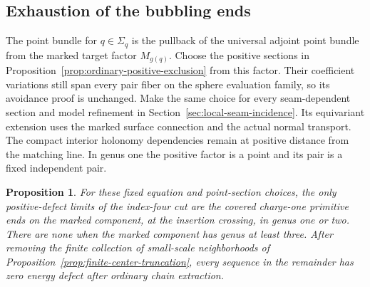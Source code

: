 \documentclass[11pt]{amsart}
\newtheorem{proposition}[theorem]{Proposition}
\theoremstyle{definition}
\theoremstyle{remark}
\theoremstyle{plain}
\begin{document}
\subsection{Exhaustion of the bubbling ends}
\label{sec:all-bubbling-cut-ends}

The point bundle for $q\in\Sigma_q$ is the pullback of
the universal adjoint point bundle from the marked
target factor $M_{g(q)}$. Choose the positive sections
in Proposition~\ref{prop:ordinary-positive-exclusion}
from this factor. Their coefficient variations still
span every pair fiber on the sphere evaluation family,
so its avoidance proof is unchanged.
Make the same choice for every seam-dependent section
and model refinement in
Section~\ref{sec:local-seam-incidence}.
Its equivariant extension uses the marked surface
connection and the actual normal transport.
The compact interior holonomy dependencies remain
at positive distance from the matching line.
In genus one the positive factor is a point and its
pair is a fixed independent pair.

\begin{proposition}\label{prop:all-bubbling-cut-ends}
For these fixed equation and point-section choices,
the only positive-defect limits of the index-four
cut are the covered charge-one primitive ends on
the marked component, at the insertion crossing,
in genus one or two. There are none when the marked
component has genus at least three.
After removing the finite collection of small-scale
neighborhoods of
Proposition~\ref{prop:finite-center-truncation},
every sequence in the remainder has zero energy
defect after ordinary chain extraction.
\end{proposition}
\end{document}
